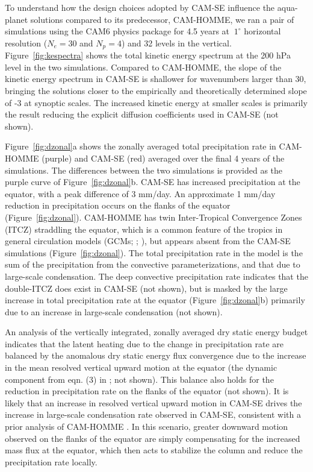 \documentclass{agujournal}
\begin{document}
{To understand how the design choices adopted by CAM-SE influence the aqua-planet solutions compared to its predecessor, CAM-HOMME, we ran a pair of simulations using the CAM6 physics package for 4.5 years at $~1^\circ$ horizontal resolution ($N_e=30$ and $N_p=4$) and 32 levels in the vertical. Figure~\ref{fig:kespectra} shows the total kinetic energy spectrum at the 200 hPa level in the two simulations. Compared to CAM-HOMME, the slope of the kinetic energy spectrum in CAM-SE is shallower for wavenumbers larger than 30, bringing the solutions closer to the empirically \citep{NG1985JAS} and theoretically \citep{C1971JAS} determined slope of -3 at synoptic scales. The increased kinetic energy at smaller scales is primarily the result reducing the explicit diffusion coefficients used in CAM-SE (not shown).

 Figure~\ref{fig:dzonal}a shows the zonally averaged total precipitation rate in CAM-HOMME (purple) and CAM-SE (red) averaged over the final 4 years of the simulations. The differences between the two simulations is provided as the purple curve of Figure~\ref{fig:dzonal}b. CAM-SE has increased precipitation at the equator, with a peak difference of 3 mm/day. An approximate 1 mm/day reduction in precipitation occurs on the flanks of the equator (Figure~\ref{fig:dzonal}). CAM-HOMME has twin Inter-Tropical Convergence Zones (ITCZ) straddling the equator, which is a common feature of the tropics in general circulation models (GCMs; \cite{BGN2010JCLIM}; \cite{MWO2016JAMES}), but appears absent from the CAM-SE simulations (Figure~\ref{fig:dzonal}). The total precipitation rate in the model is the sum of the precipitation from the convective parameterizations, and that due to large-scale condensation. The deep convective precipitation rate indicates that the double-ITCZ does exist in CAM-SE (not shown), but is masked by the large increase in total precipitation rate at the equator (Figure~\ref{fig:dzonal}b) primarily due to an increase in large-scale condensation (not shown).

An analysis of the vertically integrated, zonally averaged dry static energy budget indicates that the latent heating due to the change in precipitation rate are balanced by the anomalous dry static energy flux convergence due to the increase in the mean resolved vertical upward motion at the equator (the dynamic component from eqn. (3) in \cite{MO2011NATUREC}; not shown). This balance also holds for the reduction in precipitation rate on the flanks of the equator (not shown). It is likely that an increase in resolved vertical upward motion in CAM-SE drives the increase in large-scale condensation rate observed in CAM-SE, consistent with a prior analysis of CAM-HOMME \citep{OETAL2016JAMES}. In this scenario, greater downward motion observed on the flanks of the equator are simply compensating for the increased mass flux at the equator, which then acts to stabilize the column and reduce the precipitation rate locally.

}
\end{document}
